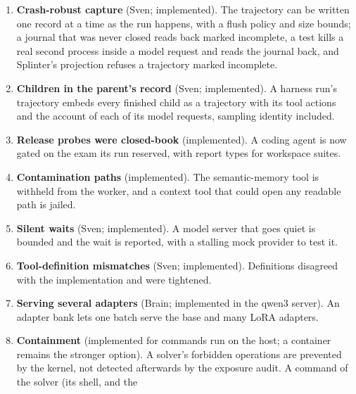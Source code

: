 \begin{enumerate}
sampling (temperature, top-$p$, top-$k$, seed) and its request for the sampled tokens reach every
model request of the run and of the children it starts. Brain's chat endpoint returns the prompt
token ids, the sampled token ids, the log-probability of each sampled token under the
distribution it was decoded from, and the seed it used, the adapter, the base-checkpoint digest, the
backend and the engine build; a step of the trajectory records them, and records each request's
own prompt and tokens when a step covers several. A seed the server drew above $2^{63}$ was once
dropped from the reply and refused when sent back.
\item \textbf{Crash-robust capture} (Sven; implemented). The trajectory can be written one
record at a time as the run happens, with a flush policy and size bounds; a journal that was never
closed reads back marked incomplete, a test kills a real second process inside a model request
and reads the journal back, and Splinter's projection refuses a trajectory marked incomplete.
\item \textbf{Children in the parent's record} (Sven; implemented). A harness run's trajectory
embeds every finished child as a trajectory with its tool actions and the account of each of
its model requests, sampling identity included.
\item \textbf{Release probes were closed-book} (implemented). A coding agent is now gated on the
exam its run reserved, with report types for workspace suites.
\item \textbf{Contamination paths} (implemented). The semantic-memory tool is withheld from the
worker, and a context tool that could open any readable path is jailed.
\item \textbf{Silent waits} (Sven; implemented). A model server that goes quiet is bounded and
the wait is reported, with a stalling mock provider to test it.
\item \textbf{Tool-definition mismatches} (Sven; implemented). Definitions disagreed with the
implementation and were tightened.
\item \textbf{Serving several adapters} (Brain; implemented in the qwen3 server). An adapter bank
lets one batch serve the base and many LoRA adapters.
\item \textbf{Containment} (implemented for commands run on the host; a container remains
the stronger option). A solver's forbidden operations are prevented by the kernel, not
detected afterwards by the exposure audit. A command of the solver (its shell, and the

\end{enumerate}
